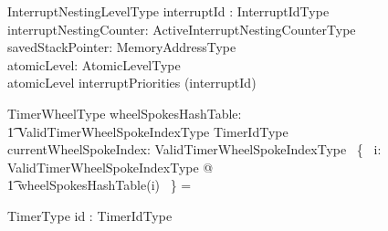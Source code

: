 \documentclass{AUJarticle}
\begin{document}
\begin{schema}{InterruptNestingLevelType}
   interruptId : InterruptIdType \\
   interruptNestingCounter: ActiveInterruptNestingCounterType \\
   savedStackPointer: MemoryAddressType \\
   atomicLevel: AtomicLevelType \\
\where
   atomicLevel \leq interruptPriorities (interruptId)
\also

\end{schema}

\begin{schema}{TimerWheelType}
   wheelSpokesHashTable: \\
   \t1 ValidTimerWheelSpokeIndexType \fun \finset TimerIdType \\
   currentWheelSpokeIndex: ValidTimerWheelSpokeIndexType
\where
    \bigcap~\{~ i: ValidTimerWheelSpokeIndexType @ \\
    \t1 wheelSpokesHashTable(i) ~\} = \emptyset
\end{schema}

\begin{schema}{TimerType}
   id : TimerIdType
\end{schema}
\end{document}
